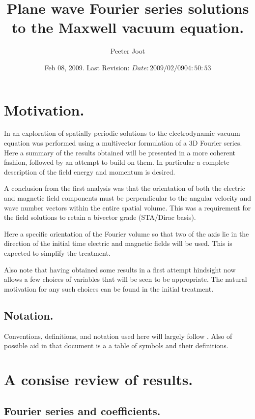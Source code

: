 \documentclass{article}
\title{ Plane wave Fourier series solutions to the Maxwell vacuum equation. }
\author{Peeter Joot}
\date{ Feb 08, 2009.  Last Revision: $Date: 2009/02/09 04:50:53 $ }
\begin{document}
\maketitle{}
\tableofcontents

\section{ Motivation. }

In \cite{PJFourierVacuum} an exploration of spatially periodic solutions to the electrodynamic vacuum equation was performed using a multivector formulation 
of a 3D Fourier series.
Here a summary of the results obtained will be presented in a more
coherent fashion, followed by an attempt to build on them.
In particular a complete
description of the field energy and momentum is desired.

A conclusion from the first analysis was that the
orientation of both the electric and magnetic field components
must be perpendicular to the angular velocity and wave number vectors 
within the entire spatial volume.  This was a requirement for the field
solutions to retain a bivector grade (STA/Dirac basis).

Here a specific orientation of the Fourier volume so that two of the axis
lie in the direction of the initial time electric and magnetic fields will be
used.  This is expected to simplify the treatment.

Also note that having obtained some results in a first attempt hindsight
now allows a few choices of variables that will be seen to be appropriate.
The natural motivation for any such choices can be found in the initial
treatment.

\subsection{ Notation. }

Conventions, definitions, and notation used here will largely follow
\cite{PJFourierVacuum}.  Also of possible aid in that document is a 
a table of symbols and their definitions.

\section{ A consise review of results. }

\subsection{ Fourier series and coefficients. }
\end{document}
